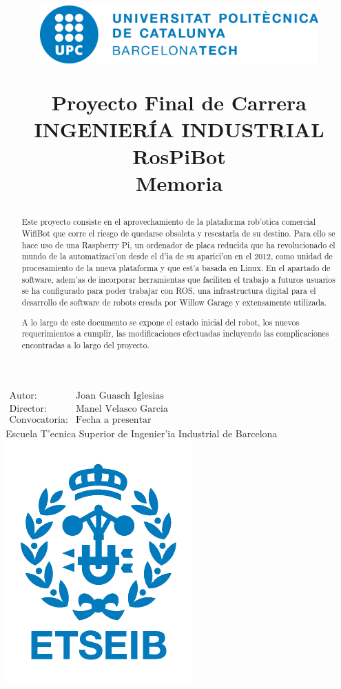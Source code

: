 \documentclass[twoside]{article}
\title{\begin{center} 
\includegraphics[width=0.8\textwidth]{images/upc-logo.png} 
\end{center} 
\vspace{0.5cm} 
Proyecto Final de Carrera\\
INGENIER\'IA INDUSTRIAL \\
\vspace{0.5cm} 
\Huge{
RosPiBot}
\vspace{0.5cm} \\
 Memoria}
\author{}
\date{} %
\begin{document}

\maketitle
\begin{center}
\large{$\begin{array}{ll}
\mbox{Autor:} & \mbox{Joan Guasch Iglesias} \\
\mbox{Director:} & \mbox{Manel Velasco Garcia} \\
\mbox{Convocatoria:} & \mbox{Fecha a presentar}
\end{array}$}\\ 
\vspace{2cm} 
\Large{Escuela T'ecnica Superior de Ingenier'ia Industrial de Barcelona}\\ 
\vspace{1cm}
\includegraphics[scale=1]{images/etseib-logo.png}
\end{center}
\thispagestyle{empty}
\newpage

\thispagestyle{empty}
\paragraph*{}
\newpage


\begin{abstract}
Este proyecto consiste en el aprovechamiento de la plataforma rob'otica comercial WifiBot que corre el riesgo de quedarse obsoleta y rescatarla de su destino. Para ello se hace uso de una Raspberry Pi, un ordenador de placa reducida que ha revolucionado el mundo de la automatizaci'on desde el d'ia de su aparici'on en el 2012, como unidad de procesamiento de la nueva plataforma y que est'a basada en Linux. En el apartado de software, adem'as de incorporar herramientas que faciliten el trabajo a futuros usuarios se ha configurado para poder trabajar con ROS, una infrastructura digital para el desarrollo de software de robots creada por Willow Garage y extensamente utilizada.

A lo largo de este documento se expone el estado inicial del robot, los nuevos requerimientos a cumplir, las modificaciones efectuadas incluyendo las complicaciones encontradas a lo largo del proyecto. 
\end{abstract}
\thispagestyle{empty}
\newpage
\end{document}
